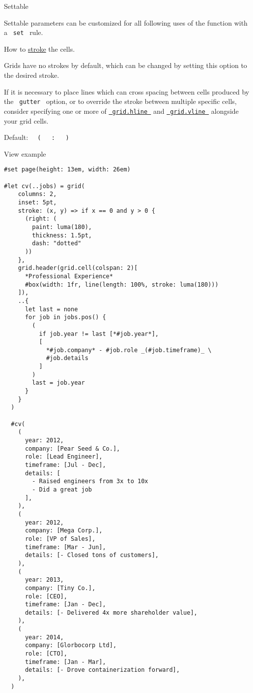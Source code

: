 {{ Settable }}

\label{parameters-stroke-settable-tooltip}
Settable parameters can be customized for all following uses of the
function with a \texttt{\ set\ } rule.

How to \href{/docs/reference/visualize/stroke/}{stroke} the cells.

Grids have no strokes by default, which can be changed by setting this
option to the desired stroke.

If it is necessary to place lines which can cross spacing between cells
produced by the \texttt{\ gutter\ } option, or to override the stroke
between multiple specific cells, consider specifying one or more of
\href{/docs/reference/layout/grid/\#definitions-hline}{\texttt{\ grid.hline\ }}
and
\href{/docs/reference/layout/grid/\#definitions-vline}{\texttt{\ grid.vline\ }}
alongside your grid cells.

Default:
\texttt{\ }{\texttt{\ (\ }}\texttt{\ }{\texttt{\ :\ }}\texttt{\ }{\texttt{\ )\ }}\texttt{\ }


View example

\begin{verbatim}
#set page(height: 13em, width: 26em)

#let cv(..jobs) = grid(
    columns: 2,
    inset: 5pt,
    stroke: (x, y) => if x == 0 and y > 0 {
      (right: (
        paint: luma(180),
        thickness: 1.5pt,
        dash: "dotted"
      ))
    },
    grid.header(grid.cell(colspan: 2)[
      *Professional Experience*
      #box(width: 1fr, line(length: 100%, stroke: luma(180)))
    ]),
    ..{
      let last = none
      for job in jobs.pos() {
        (
          if job.year != last [*#job.year*],
          [
            *#job.company* - #job.role _(#job.timeframe)_ \
            #job.details
          ]
        )
        last = job.year
      }
    }
  )

  #cv(
    (
      year: 2012,
      company: [Pear Seed & Co.],
      role: [Lead Engineer],
      timeframe: [Jul - Dec],
      details: [
        - Raised engineers from 3x to 10x
        - Did a great job
      ],
    ),
    (
      year: 2012,
      company: [Mega Corp.],
      role: [VP of Sales],
      timeframe: [Mar - Jun],
      details: [- Closed tons of customers],
    ),
    (
      year: 2013,
      company: [Tiny Co.],
      role: [CEO],
      timeframe: [Jan - Dec],
      details: [- Delivered 4x more shareholder value],
    ),
    (
      year: 2014,
      company: [Glorbocorp Ltd],
      role: [CTO],
      timeframe: [Jan - Mar],
      details: [- Drove containerization forward],
    ),
  )
\end{verbatim}

